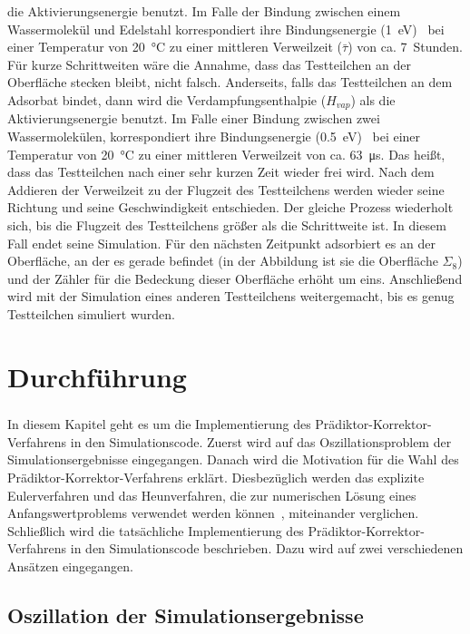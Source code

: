 \documentclass{listhesis}
\begin{document}
die Aktivierungsenergie benutzt. Im Falle der Bindung zwischen einem Wassermolekül und Edelstahl korrespondiert ihre Bindungsenergie (\SI{1}{\electronvolt})~\cite{grinham} bei einer Temperatur von \SI{20}{\celsius} zu einer mittleren Verweilzeit ($\bar{\tau}$) von ca. \SI{7}{Stunden}. Für kurze Schrittweiten wäre die Annahme, dass das Testteilchen an der Oberfläche stecken bleibt, nicht falsch. Anderseits, falls das Testteilchen an dem Adsorbat bindet, dann wird die Verdampfungsenthalpie ($H_{vap}$) als die Aktivierungsenergie benutzt. Im Falle einer Bindung zwischen zwei Wassermolekülen, korrespondiert ihre Bindungsenergie (\SI{0.5}{\electronvolt})~\cite{grinham} bei einer Temperatur von \SI{20}{\celsius} zu einer mittleren Verweilzeit von ca. \SI{63}{\micro\s}. Das heißt, dass das Testteilchen nach einer sehr kurzen Zeit wieder frei wird. Nach dem Addieren der Verweilzeit zu der Flugzeit des Testteilchens werden wieder seine Richtung und seine Geschwindigkeit entschieden. Der gleiche Prozess wiederholt sich, bis die Flugzeit des Testteilchens größer als die Schrittweite ist. In diesem Fall endet seine Simulation. Für den nächsten Zeitpunkt adsorbiert es an der Oberfläche, an der es gerade befindet (in der Abbildung ist sie die Oberfläche $\Sigma_8$) und der Zähler für die Bedeckung dieser Oberfläche erhöht um eins. Anschließend wird mit der Simulation eines anderen Testteilchens weitergemacht, bis es genug Testteilchen simuliert wurden.

\chapter{Durchführung} \label{chap:durchfuehrung}
\paragraph{}
In diesem Kapitel geht es um die Implementierung des Prädiktor-Korrektor-Verfa\-hrens in den Simulationscode. Zuerst wird auf das Oszillationsproblem der Simulationsergebnisse eingegangen. Danach wird die Motivation für die Wahl des Prädiktor-Korrektor-Verfahrens erklärt. Diesbezüglich werden das explizite Eulerverfahren und das Heunverfahren, die zur numerischen Lösung eines Anfangswertproblems verwendet werden können~\cite{ulbrich}, miteinander verglichen. Schließlich wird die tatsächliche Implementierung des Prädiktor-Korrektor-Verfahrens in den Simulationscode beschrieben. Dazu wird auf zwei verschiedenen Ansätzen eingegangen.

\section{Oszillation der Simulationsergebnisse} \label{section:oscillation}
\end{document}
